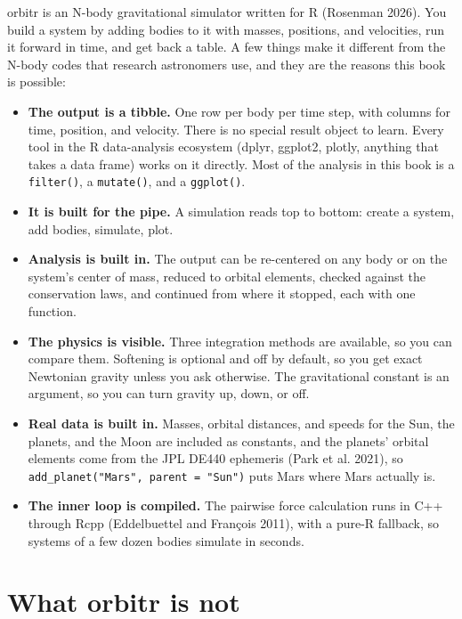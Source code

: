 \documentclass[
  10.5pt,
  letterpaper,
]{scrbook}
\providecommand{\tightlist}{%
  \setlength{\itemsep}{0pt}\setlength{\parskip}{0pt}}
\theoremstyle{definition}
\theoremstyle{plain}
\theoremstyle{remark}
\begin{document}
orbitr is an N-body gravitational simulator written for R (Rosenman
2026). You build a system by adding bodies to it with masses, positions,
and velocities, run it forward in time, and get back a table. A few
things make it different from the N-body codes that research astronomers
use, and they are the reasons this book is possible:

\begin{itemize}
\tightlist
\item
  \textbf{The output is a tibble.} One row per body per time step, with
  columns for time, position, and velocity. There is no special result
  object to learn. Every tool in the R data-analysis ecosystem (dplyr,
  ggplot2, plotly, anything that takes a data frame) works on it
  directly. Most of the analysis in this book is a \texttt{filter()}, a
  \texttt{mutate()}, and a \texttt{ggplot()}.
\item
  \textbf{It is built for the pipe.} A simulation reads top to bottom:
  create a system, add bodies, simulate, plot.
\item
  \textbf{Analysis is built in.} The output can be re-centered on any
  body or on the system's center of mass, reduced to orbital elements,
  checked against the conservation laws, and continued from where it
  stopped, each with one function.
\item
  \textbf{The physics is visible.} Three integration methods are
  available, so you can compare them. Softening is optional and off by
  default, so you get exact Newtonian gravity unless you ask otherwise.
  The gravitational constant is an argument, so you can turn gravity up,
  down, or off.
\item
  \textbf{Real data is built in.} Masses, orbital distances, and speeds
  for the Sun, the planets, and the Moon are included as constants, and
  the planets' orbital elements come from the JPL DE440 ephemeris (Park
  et al. 2021), so \texttt{add\_planet("Mars",\ parent\ =\ "Sun")} puts
  Mars where Mars actually is.
\item
  \textbf{The inner loop is compiled.} The pairwise force calculation
  runs in C++ through Rcpp (Eddelbuettel and François 2011), with a
  pure-R fallback, so systems of a few dozen bodies simulate in seconds.
\end{itemize}

\section{What orbitr is not}\label{what-orbitr-is-not}
\end{document}

